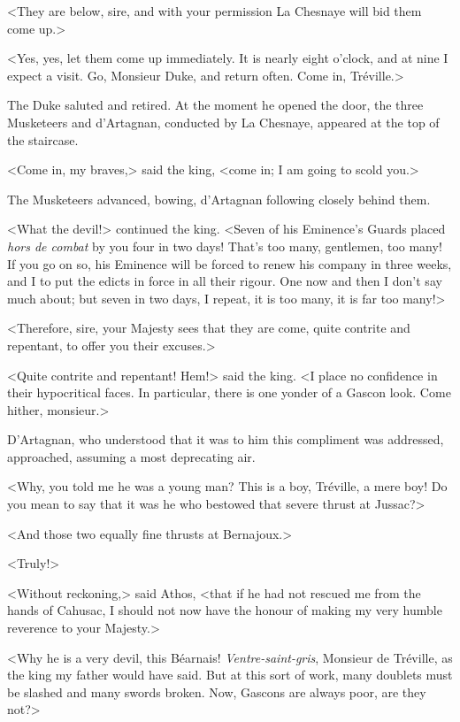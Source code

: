 <They are below, sire, and with your permission La Chesnaye will bid them come up.> 

<Yes, yes, let them come up immediately. It is nearly eight o'clock, and at nine I expect a visit. Go, Monsieur Duke, and return often. Come in, Tréville.> 

The Duke saluted and retired. At the moment he opened the door, the three Musketeers and d'Artagnan, conducted by La Chesnaye, appeared at the top of the staircase. 

<Come in, my braves,> said the king, <come in; I am going to scold you.> 

The Musketeers advanced, bowing, d'Artagnan following closely behind them. 

<What the devil!> continued the king. <Seven of his Eminence's Guards placed \textit{hors de combat} by you four in two days! That's too many, gentlemen, too many! If you go on so, his Eminence will be forced to renew his company in three weeks, and I to put the edicts in force in all their rigour. One now and then I don't say much about; but seven in two days, I repeat, it is too many, it is far too many!> 

<Therefore, sire, your Majesty sees that they are come, quite contrite and repentant, to offer you their excuses.> 

<Quite contrite and repentant! Hem!> said the king. <I place no confidence in their hypocritical faces. In particular, there is one yonder of a Gascon look. Come hither, monsieur.> 

D'Artagnan, who understood that it was to him this compliment was addressed, approached, assuming a most deprecating air. 

<Why, you told me he was a young man? This is a boy, Tréville, a mere boy! Do you mean to say that it was he who bestowed that severe thrust at Jussac?> 

<And those two equally fine thrusts at Bernajoux.> 

<Truly!> 

<Without reckoning,> said Athos, <that if he had not rescued me from the hands of Cahusac, I should not now have the honour of making my very humble reverence to your Majesty.> 

<Why he is a very devil, this Béarnais! \textit{Ventre-saint-gris}, Monsieur de Tréville, as the king my father would have said. But at this sort of work, many doublets must be slashed and many swords broken. Now, Gascons are always poor, are they not?> 

